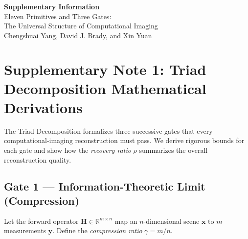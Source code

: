 \documentclass[11pt]{article}
\begin{document}
\clearpage

\setcounter{section}{0}
\renewcommand{\thesection}{S\arabic{section}}
\renewcommand{\thesubsection}{S\arabic{section}.\arabic{subsection}}
\renewcommand{\thetable}{S\arabic{table}}
\setcounter{table}{0}
\renewcommand{\thefigure}{S\arabic{figure}}
\setcounter{figure}{0}
\renewcommand{\theequation}{S\arabic{equation}}
\setcounter{equation}{0}

\begin{center}
{\Large\bfseries Supplementary Information}\\[12pt]
{\large Eleven Primitives and Three Gates:\\
The Universal Structure of Computational Imaging}\\[8pt]
{\normalsize Chengshuai Yang, David J. Brady, and Xin Yuan}
\end{center}

\vspace{12pt}
\renewcommand{\contentsname}{Supplementary Contents}
\tableofcontents
\newpage






\newpage

\section{Supplementary Note 1: Triad Decomposition Mathematical Derivations}
\label{sec:triad}

The Triad Decomposition formalizes three successive gates that every computational-imaging
reconstruction must pass.  We derive rigorous bounds for each gate and show how
the \emph{recovery ratio} $\rho$ summarizes the overall reconstruction quality.

\subsection{Gate 1 --- Information-Theoretic Limit (Compression)}

Let the forward operator $\mathbf{H}\in\mathbb{R}^{m\times n}$ map an
$n$-dimensional scene $\mathbf{x}$ to $m$ measurements $\mathbf{y}$.
Define the \emph{compression ratio} $\gamma = m/n$.
\end{document}
